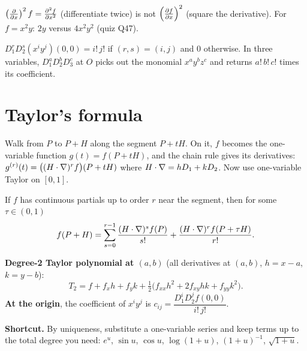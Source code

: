 \begin{trap}
$\left(\frac{\partial }{\partial x}\right)^2f=\frac{\partial^2 f}{\partial x^2}$ (differentiate twice) is not $\left(\frac{\partial f}{\partial x}\right)^2$ (square the
derivative). For $f=x^2y$: $2y$ versus $4x^2y^2$ (quiz Q47).
\end{trap}

\begin{prop}
$D_1^rD_2^s(x^iy^j)(0,0)=i!\,j!$ if $(r,s)=(i,j)$ and $0$ otherwise. In three variables,
$D_1^aD_2^bD_3^c$ at $O$ picks out the monomial $x^ay^bz^c$ and returns $a!\,b!\,c!$ times its
coefficient.
\end{prop}

\section{Taylor's formula}

\begin{intuition}
Walk from $P$ to $P+H$ along the segment $P+tH$. On it, $f$ becomes the one-variable function
$g(t)=f(P+tH)$, and the chain rule gives its derivatives: $g^{(r)}(t)=\big((H\cdot\nabla)^rf\big)(P+tH)$
where $H\cdot\nabla=hD_1+kD_2$. Now use one-variable Taylor on $[0,1]$.
\end{intuition}

\begin{thm}
If $f$ has continuous partials up to order $r$ near the segment, then for some $\tau\in(0,1)$
\[
f(P+H)=\sum_{s=0}^{r-1}\frac{(H\cdot\nabla)^sf(P)}{s!}+\frac{(H\cdot\nabla)^rf(P+\tau H)}{r!}.
\]
\end{thm}

\begin{method}
\textbf{Degree-2 Taylor polynomial at $(a,b)$} (all derivatives at $(a,b)$, $h=x-a$, $k=y-b$):
\[
T_2=f+f_xh+f_yk+\tfrac12\big(f_{xx}h^2+2f_{xy}hk+f_{yy}k^2\big).
\]
\textbf{At the origin}, the coefficient of $x^iy^j$ is $c_{ij}=\dfrac{D_1^iD_2^jf(0,0)}{i!\,j!}$.

\textbf{Shortcut.} By uniqueness, substitute a one-variable series and keep terms up to the
total degree you need: $e^u$, $\sin u$, $\cos u$, $\log(1+u)$, $(1+u)^{-1}$, $\sqrt{1+u}$.
\end{method}

\begin{center}
\end{center}

